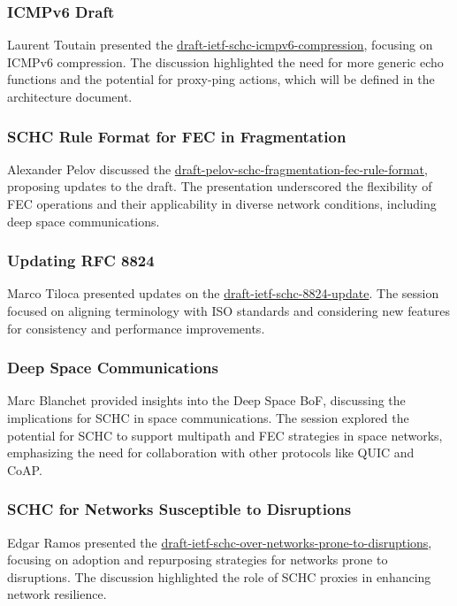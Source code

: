 \documentclass{article}
\begin{document}
\subsubsection{ICMPv6 Draft}
Laurent Toutain presented the \href{https://datatracker.ietf.org/doc/html/draft-ietf-schc-icmpv6-compression}{draft-ietf-schc-icmpv6-compression}, focusing on ICMPv6 compression. The discussion highlighted the need for more generic echo functions and the potential for proxy-ping actions, which will be defined in the architecture document.

\subsubsection{SCHC Rule Format for FEC in Fragmentation}
Alexander Pelov discussed the \href{https://datatracker.ietf.org/doc/html/draft-pelov-schc-fragmentation-fec-rule-format}{draft-pelov-schc-fragmentation-fec-rule-format}, proposing updates to the draft. The presentation underscored the flexibility of FEC operations and their applicability in diverse network conditions, including deep space communications.

\subsubsection{Updating RFC 8824}
Marco Tiloca presented updates on the \href{https://datatracker.ietf.org/doc/html/draft-ietf-schc-8824-update}{draft-ietf-schc-8824-update}. The session focused on aligning terminology with ISO standards and considering new features for consistency and performance improvements.

\subsubsection{Deep Space Communications}
Marc Blanchet provided insights into the Deep Space BoF, discussing the implications for SCHC in space communications. The session explored the potential for SCHC to support multipath and FEC strategies in space networks, emphasizing the need for collaboration with other protocols like QUIC and CoAP.

\subsubsection{SCHC for Networks Susceptible to Disruptions}
Edgar Ramos presented the \href{https://datatracker.ietf.org/doc/html/draft-ietf-schc-over-networks-prone-to-disruptions}{draft-ietf-schc-over-networks-prone-to-disruptions}, focusing on adoption and repurposing strategies for networks prone to disruptions. The discussion highlighted the role of SCHC proxies in enhancing network resilience.
\end{document}
